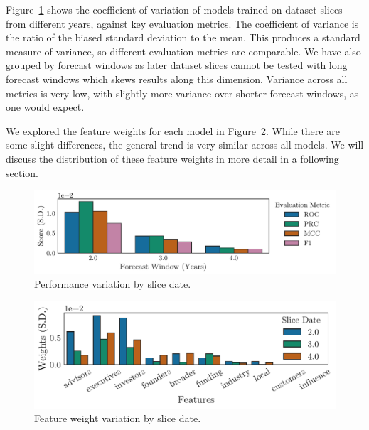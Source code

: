 \documentclass[../thesis/thesis.tex]{subfiles}
\begin{document}
Figure~\ref{fig:evaluation:performance_slice} shows the coefficient of variation of models trained on dataset slices from different years, against key evaluation metrics. The coefficient of variance is the ratio of the biased standard deviation to the mean. This produces a standard measure of variance, so different evaluation metrics are comparable. We have also grouped by forecast windows as later dataset slices cannot be tested with long forecast windows which skews results along this dimension. Variance across all metrics is very low, with slightly more variance over shorter forecast windows, as one would expect.

We explored the feature weights for each model in Figure~\ref{fig:evaluation:features_slice}. While there are some slight differences, the general trend is very similar across all models. We will discuss the distribution of these feature weights in more detail in a following section.

\begin{figure}[!htb]
    \centering
    \includegraphics[width=\textwidth]{../figures/evaluation/performance_slice}
    \caption[Performance variation by slice date]{Performance variation by slice date.}
    \label{fig:evaluation:performance_slice}
\end{figure}

\begin{figure}[!htb]
    \centering
    \includegraphics[width=\textwidth]{../figures/evaluation/features_slice}
    \caption[Feature weight variation by slice date]{Feature weight variation by slice date.}
    \label{fig:evaluation:features_slice}
\end{figure}
\end{document}

